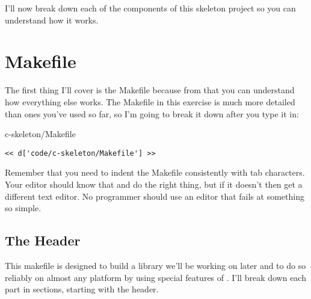 I'll now break down each of the components of this skeleton project
so you can understand how it works.

\section{Makefile}

The first thing I'll cover is the Makefile because from that you can understand
how everything else works.  The Makefile in this exercise is much more detailed
than ones you've used so far, so I'm going to break it down after you type it
in:

\begin{code}{c-skeleton/Makefile}
\begin{lstlisting}
<< d['code/c-skeleton/Makefile'] >>
\end{lstlisting}
\end{code}

Remember that you need to indent the Makefile consistently with tab characters.
Your editor should know that and do the right thing, but if it doesn't then get
a different text editor.  No programmer should use an editor that fails at 
something so simple.

\subsection{The Header}

This makefile is designed to build a library we'll be working on later and 
to do so reliably on almost any platform by using special features of .  I'll break down each part in sections, starting with the header.


